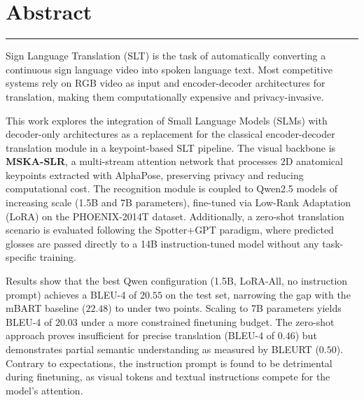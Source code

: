 \documentclass[a4paper, 11pt]{book}
\begin{document}
\author{Nicolás Rodríguez Ruiz}



\newpage
\mbox{}
\thispagestyle{empty}



\newpage
\mbox{}
\thispagestyle{empty}

\newpage
{}
\section*{Abstract}
\vspace{-0.25cm}
\hrule
\vspace{0.5cm}
Sign Language Translation (SLT) is the task of automatically converting a continuous sign language video into spoken language text.
Most competitive systems rely on RGB video as input and encoder-decoder architectures for translation, making them computationally expensive and privacy-invasive.

This work explores the integration of Small Language Models (SLMs) with decoder-only architectures as a replacement for the classical encoder-decoder translation module in a keypoint-based SLT pipeline.
The visual backbone is \textbf{MSKA-SLR}, a multi-stream attention network that processes $2$D anatomical keypoints extracted with AlphaPose, preserving privacy and reducing computational cost.
The recognition module is coupled to Qwen2.5 models of increasing scale (1.5B and 7B parameters), fine-tuned via Low-Rank Adaptation (LoRA) on the PHOENIX-2014T dataset.
Additionally, a zero-shot translation scenario is evaluated following the Spotter+GPT paradigm, where predicted glosses are passed directly to a 14B instruction-tuned model without any task-specific training.

Results show that the best Qwen configuration (1.5B, LoRA-All, no instruction prompt) achieves a BLEU-4 of $20.55$ on the test set, narrowing the gap with the mBART baseline ($22.48$) to under two points.
Scaling to 7B parameters yields BLEU-4 of $20.03$ under a more constrained finetuning budget.
The zero-shot approach proves insufficient for precise translation (BLEU-4 of $0.46$) but demonstrates partial semantic understanding as measured by BLEURT ($0.50$).
Contrary to expectations, the instruction prompt is found to be detrimental during finetuning, as visual tokens and textual instructions compete for the model's attention.
\end{document}
